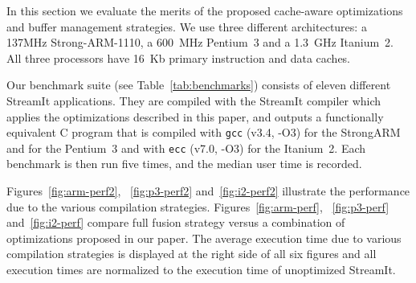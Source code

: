 \begin{figure*}
\begin{minipage}{3.4in}
\caption{Performance of various compilation strategies on a Pentium~3.\protect\label{fig:p3-perf2}}
\end{minipage}
\hspace{0.1in}
\begin{minipage}{3.4in}
\caption{Full fusion versus \texttt{CAF+scaling+buffer} on a Pentium~3\protect\label{fig:p3-perf}}
\end{minipage}
\end{figure*}

\begin{figure*}
\begin{minipage}{3.4in}
\caption{Performance of various compilation strategies on an Itanium~2.\protect\label{fig:i2-perf2}}
\end{minipage}
\hspace{0.1in}
\begin{minipage}{3.4in}
\caption{Full fusion versus \texttt{CAF+scaling+buffer} on an Itanium~2\protect\label{fig:i2-perf}}
\end{minipage}
\end{figure*}



In this section we evaluate the merits of the proposed cache-aware
optimizations and buffer management strategies. We use three
different architectures: a 137MHz Strong-ARM-1110, a 600~MHz Pentium~3 and 
a 1.3~GHz Itanium~2. All three processors have 16~Kb primary instruction and data caches.


Our benchmark suite (see Table~\ref{tab:benchmarks}) consists of eleven
different StreamIt applications. They are compiled with the StreamIt
compiler which applies the optimizations described in this paper, and
outputs a functionally equivalent C program that is compiled with
\texttt{gcc} (v3.4, -O3) for the StrongARM and for the Pentium~3 and with
\texttt{ecc} (v7.0, -O3) for the Itanium~2. Each benchmark is
then run five times, and the median user time is recorded.


Figures~\ref{fig:arm-perf2}, ~\ref{fig:p3-perf2} and~\ref{fig:i2-perf2} 
illustrate the performance due to the various compilation strategies. 
Figures~\ref{fig:arm-perf}, ~\ref{fig:p3-perf} and~\ref{fig:i2-perf} 
compare full fusion strategy versus a combination of optimizations 
proposed in our paper. The average execution time due to various compilation 
strategies is displayed at the right side of all six figures and all 
execution times are normalized to the execution time of unoptimized 
StreamIt.


